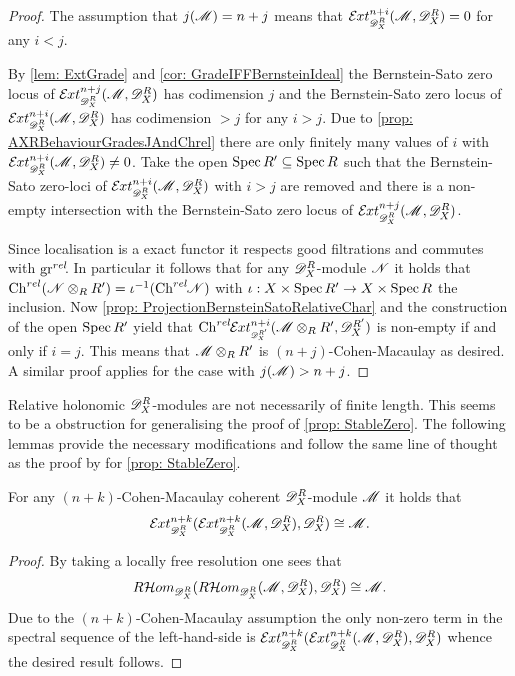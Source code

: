 \begin{proof}
  The assumption that $j(\mathscr{M}) = n+j$ means that $\Ex{\D_X^R}{n+i}(\M,\D_X^R) = 0$ for any $i<j$.

  By \cref{lem: ExtGrade} and \cref{cor: GradeIFFBernsteinIdeal} the Bernstein-Sato zero locus of  $\Ex{\D_X^R}{n+j}(\M,\D_X^R)$ has codimension $j$ and the Bernstein-Sato zero locus of $\Ex{\D_X^R}{n+i}(\M,\D_X^R)$ has codimension $>j$ for any $i>j$.
  Due to \cref{prop: AXRBehaviourGradesJAndChrel} there are only finitely many values of $i$ with $\Ex{\D_X^R}{n+i}(\M,\D_X^R) \neq 0$.
  Take the open $\operatorname{Spec} R' \subseteq \operatorname{Spec} R$ such that the Bernstein-Sato zero-loci of $\Ex{\D_X^R}{n+i}(\M,\D_X^R)$ with $i>j$ are removed and there is a non-empty intersection with the Bernstein-Sato zero locus of $\Ex{\D_X^R}{n+j}(\M,\D_X^R)$.

  Since localisation is a exact functor it respects good filtrations and commutes with $\operatorname{gr}^{rel}\mkern-5mu$.
  In particular it follows that for any $\mathscr{D}_X^R$-module $\mathscr{N}$ it holds that $\operatorname{Ch}^{rel}(\mathscr{N}\otimes_R R')= \iota^{-1}(\operatorname{Ch}^{rel}\mkern-5mu\mathscr{N})$ with $\iota:X\times \operatorname{Spec} R' \to X\times\operatorname{Spec} R$ the inclusion.
  Now \cref{prop: ProjectionBernsteinSatoRelativeChar} and the construction of the open $\operatorname{Spec} R'$ yield that $\Chrel\Ex{\D_X^{R'}}{n+i}(\M\otimes_R R',\D_X^{R'})$ is non-empty if and only if $i=j$.
  This means that $\mathscr{M}\otimes_R R'$ is $(n+j)$-Cohen-Macaulay as desired.
  A similar proof applies for the case with $j(\mathscr{M})>n+j$.
\end{proof}
Relative holonomic $\mathscr{D}_X^R$-modules are not necessarily of finite length.
This seems to be a obstruction for generalising the proof of \cref{prop: StableZero}.
The following lemmas provide the necessary modifications and follow the same line of thought as the proof by \cite{kashiwara1976b} for \cref{prop: StableZero}.
\begin{lemma}
  For any $(n+k)$-Cohen-Macaulay coherent $\mathscr{D}_X^R$-module $\mathscr{M}$ it holds that  $$\Ex{\D_X^R}{n+k}(\Ex{\D_X^R}{n+k}(\M,\D_X^R),\D_X^R) \cong \M.$$
\end{lemma}
\begin{proof}
  By taking a locally free resolution one sees that
  $$R\mathcal{H}om_{\mathscr{D}_X^R}(R\mathcal{H}om_{\mathscr{D}_X^R}(\mathscr{M}, \mathscr{D}_X^R),\mathscr{D}_X^R) \cong \mathscr{M}.$$
  Due to the $(n+k)$-Cohen-Macaulay assumption the only non-zero term in the spectral sequence of the left-hand-side is $\Ex{\D_X^R}{n+k}(\Ex{\D_X^R}{n+k}(\M,\D_X^R),\D_X^R)$ whence the desired result follows.
\end{proof}

